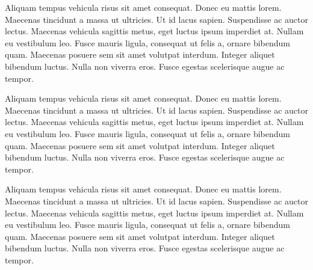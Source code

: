 \label{anex:lorem2}

Aliquam tempus vehicula risus sit amet consequat. Donec eu mattis lorem. Maecenas tincidunt a massa ut ultricies. Ut id lacus sapien. Suspendisse ac auctor lectus. Maecenas vehicula sagittis metus, eget luctus ipsum imperdiet at. Nullam eu vestibulum leo. Fusce mauris ligula, consequat ut felis a, ornare bibendum quam. Maecenas posuere sem sit amet volutpat interdum. Integer aliquet bibendum luctus. Nulla non viverra eros. Fusce egestas scelerisque augue ac tempor.


Aliquam tempus vehicula risus sit amet consequat. Donec eu mattis lorem. Maecenas tincidunt a massa ut ultricies. Ut id lacus sapien. Suspendisse ac auctor lectus. Maecenas vehicula sagittis metus, eget luctus ipsum imperdiet at. Nullam eu vestibulum leo. Fusce mauris ligula, consequat ut felis a, ornare bibendum quam. Maecenas posuere sem sit amet volutpat interdum. Integer aliquet bibendum luctus. Nulla non viverra eros. Fusce egestas scelerisque augue ac tempor.


Aliquam tempus vehicula risus sit amet consequat. Donec eu mattis lorem. Maecenas tincidunt a massa ut ultricies. Ut id lacus sapien. Suspendisse ac auctor lectus. Maecenas vehicula sagittis metus, eget luctus ipsum imperdiet at. Nullam eu vestibulum leo. Fusce mauris ligula, consequat ut felis a, ornare bibendum quam. Maecenas posuere sem sit amet volutpat interdum. Integer aliquet bibendum luctus. Nulla non viverra eros. Fusce egestas scelerisque augue ac tempor.